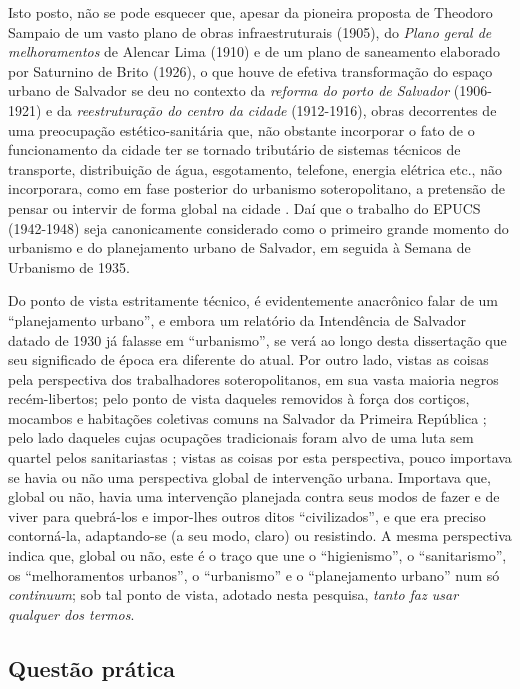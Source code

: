 Isto posto, não se pode esquecer que, apesar da pioneira proposta de Theodoro Sampaio de um vasto plano de obras infraestruturais (1905), do \textit{Plano geral de melhoramentos} de Alencar Lima (1910) e de um plano de saneamento elaborado por Saturnino de Brito (1926), o que houve de efetiva transformação do espaço urbano de Salvador se deu no contexto da \textit{reforma do porto de Salvador} (1906-1921) e da \textit{reestruturação do centro da cidade} (1912-1916), obras decorrentes de uma preocupação estético-sanitária que, não obstante incorporar o fato de o funcionamento da cidade ter se tornado tributário de sistemas técnicos de transporte, distribuição de água, esgotamento, telefone, energia elétrica etc., não incorporara, como em fase posterior do urbanismo soteropolitano, a pretensão de pensar ou intervir de forma global na cidade \cite{fernandessampaiogomes1999}. Daí que o trabalho do EPUCS (1942-1948) seja canonicamente considerado como o primeiro grande momento do urbanismo e do planejamento urbano de Salvador, em seguida à Semana de Urbanismo de 1935.

Do ponto de vista estritamente técnico, é evidentemente anacrônico falar de um ``planejamento urbano'', e embora um relatório da Intendência de Salvador datado de 1930 já falasse em ``urbanismo'', se verá ao longo desta dissertação que seu significado de época era diferente do atual. Por outro lado, vistas as coisas pela perspectiva dos trabalhadores soteropolitanos, em sua vasta maioria negros recém-libertos; pelo ponto de vista daqueles removidos à força dos cortiços, mocambos e habitações coletivas comuns na Salvador da Primeira República \cite{cardoso1990proleta}; pelo lado daqueles cujas ocupações tradicionais foram alvo de uma luta sem quartel pelos sanitariastas \cite{barbosa2009}; vistas as coisas por esta perspectiva, pouco importava se havia ou não uma perspectiva global de intervenção urbana. Importava que, global ou não, havia uma intervenção planejada contra seus modos de fazer e de viver para quebrá-los e impor-lhes outros ditos ``civilizados'', e que era preciso contorná-la, adaptando-se (a seu modo, claro) ou resistindo. A mesma perspectiva indica que, global ou não, este é o traço que une o ``higienismo'', o ``sanitarismo'', os ``melhoramentos urbanos'', o ``urbanismo'' e o ``planejamento urbano'' num só \textit{continuum}; sob tal ponto de vista, adotado nesta pesquisa, \textit{tanto faz usar qualquer dos termos}. 

\subsection{Questão prática}
\label{subsec:questprat}

